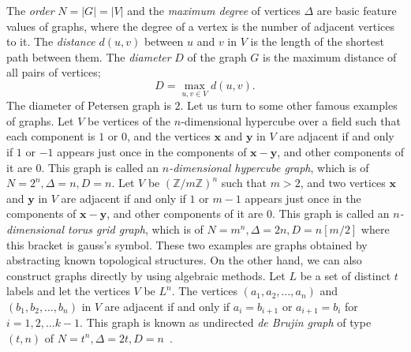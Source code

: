 \documentclass[conference]{IEEEtran}
\newcommand{\Z}{\mathbb Z}
\begin{document}
The {\it order} $N=|G|=|V|$ and the {\it maximum degree} of vertices $\Delta$ are basic feature values of
graphs, where the degree of a vertex is the number of adjacent vertices to it.
The {\it distance} $d(u,v)$ between $u$ and $v$ in $V$  is the length of the shortest path between them.
The {\it diameter} $D$ of the graph $G$ is the maximum distance of all pairs of vertices;
\[ D = \max_{u,  v \in V} d(u,v). \]
The diameter of Petersen graph is $2$.
Let us turn to some other famous examples of graphs.
Let $V$ be vertices of the $n$-dimensional hypercube over a field such that each component is $1$ or $0$,
and the vertices ${\bm x}$ and ${\bm y}$ in $V$ are adjacent if and only if $1$ or $-1$ appears just once in the components of ${\bm x}-{\bm y}$, and other components of it are $0$.
This graph is called an {\it $n$-dimensional hypercube graph},
which is of $N=2^n, \Delta=n, D=n$.
Let $V$ be ${(\Z/m\Z)}^n$ such that $m > 2$, and two vertices ${\bm x}$ and ${\bm y}$ in $V$ are adjacent
if and only if $1$ or $m-1$ appears just once in the components of ${\bm x}-{\bm y}$, and other components of it are $0$.
This graph is called an {\it $n$-dimensional torus grid graph},
which is of $N=m^n, \Delta=2n, D=n [m/2]$ where this bracket is gauss's symbol.
These two examples are graphs obtained by abstracting known topological structures.
On the other hand, we can also construct graphs directly by using algebraic methods.
Let $L$ be a set of distinct $t$ labels and let the vertices $V$ be $L^n$.
The vertices $(a_1, a_2, \ldots, a_n)$ and $(b_1, b_2, \ldots, b_n)$ in $V$ are adjacent if and only if $a_i = b_{i+1}$ or $a_{i+1} = b_i$ for $i=1,2, \ldots k-1$.
This graph is known as undirected {\it de Brujin graph} of type $(t,n)$
of $N=t^n, \Delta=2t, D=n$~\cite{bruijn1946combinatorial,good1946normal}.
\end{document}
